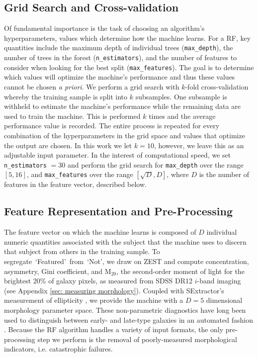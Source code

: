 \documentclass[twocolumn,  trackchanges, ]{aastex6}%
\newcommand{\feat}{`Featured'}
\newcommand{\notfeat}{`Not'}
\begin{document}
\subsection{Grid Search and Cross-validation}
Of fundamental importance is the task of choosing an algorithm's hyperparameters, 
values which determine how the machine learns.   For a RF, key quantities include
 the maximum depth of individual trees (\texttt{max\_depth}), the number of trees
in the forest (\texttt{n\_estimators}), and the number of features to consider when 
looking for the best split (\texttt{max\_features}). 
The goal is to determine which values will optimize 
the machine's performance and thus these values cannot be chosen \textit{a priori}. 
We perform a grid search with $k$-fold cross-validation whereby the 
training sample is split into $k$ subsamples. One subsample is withheld to 
estimate the machine's performance while the remaining data are used to train the machine. 
This is performed $k$ times and the average performance
value is recorded. The entire process is repeated for every combination of the 
 hyperparameters in the grid space and values that optimize the output are chosen. 
In this work we let $k=10$, however, we leave this as an adjustable input parameter.
In the interest of computational speed, we set \texttt{n\_estimators} $=30$ and 
perform the grid search for \texttt{max\_depth} over the range $[5,16]$, and 
\texttt{max\_features} over the range $[\sqrt{D}, D]$,
where $D$ is the number of features in the feature vector, described below.
 

\subsection{Feature Representation and Pre-Processing}
The feature vector on which the machine learns is composed of $D$ individual numeric quantities associated with the subject that the machine uses to discern that subject from others in the training sample. To segregate~\feat~from~\notfeat, we draw on ZEST \citep{Scarlata2007} and compute concentration, asymmetry, Gini coefficient, and M$_{20}$, the second-order moment of light for the brightest 20\% of galaxy pixels, as measured from SDSS DR12 $i$-band imaging (see Appendix \ref{sec: measuring morphology}). Coupled with SExtractor's measurement of ellipticity \citep{sextractor}, we provide the machine with a $D=5$ dimensional morphology parameter space.  These non-parametric diagnostics have long been used to distinguish between early- and late-type galaxies in an automated fashion \cite[e.g.,][]{Abraham1996, Bershady2000, Conselice2000, Abraham2003, Conselice2003, Lotz2004, Snyder2015}. Because the RF algorithm handles a variety of input formats, the only pre-processing step we perform is the removal of poorly-measured morphological indicators, i.e. catastrophic failures.
\end{document}
